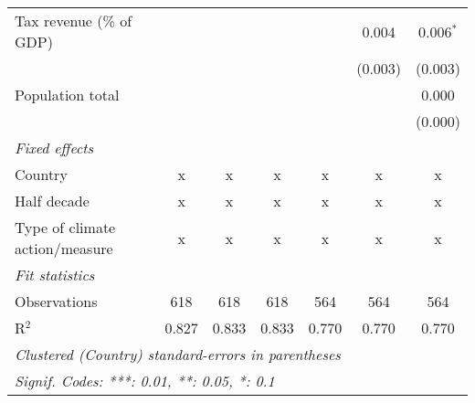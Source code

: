 \begin{tabular}{lcccccc}
   Tax revenue (\% of GDP)                                           &              &                &                &                & 0.004          & 0.006$^{*}$\\   
                                                                     &              &                &                &                & (0.003)        & (0.003)\\   
   Population total                                                  &              &                &                &                &                & 0.000\\   
                                                                     &              &                &                &                &                & (0.000)\\   
   \emph{Fixed effects}\\
   Country                                                           & x            & x              & x              & x              & x              & x\\  
   Half decade                                                       & x            & x              & x              & x              & x              & x\\  
   Type of climate action/measure                                    & x            & x              & x              & x              & x              & x\\  
   \midrule \emph{Fit statistics}\\
   Observations                                                      & 618          & 618            & 618            & 564            & 564            & 564\\  
   R$^2$                                                             & 0.827        & 0.833          & 0.833          & 0.770          & 0.770          & 0.770\\  
   \midrule
   \multicolumn{7}{l}{\emph{Clustered (Country) standard-errors in parentheses}}\\
   \multicolumn{7}{l}{\emph{Signif. Codes: ***: 0.01, **: 0.05, *: 0.1}}\\
\end{tabular}
\par\endgroup


